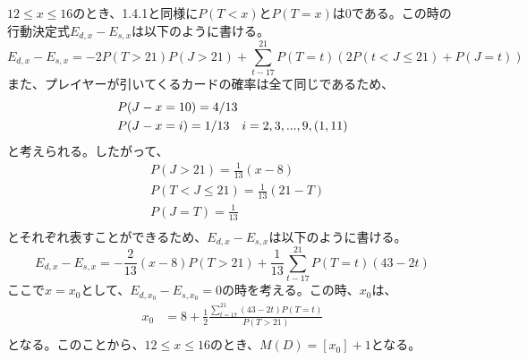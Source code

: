         \subsubsection{}
            $12\leq x \leq 16$のとき、1.4.1と同様に$P(T < x)$と$P(T = x)$は0である。この時の行動決定式$E_{d,x} - E_{s,x}$は以下のように書ける。
            \begin{displaymath}
                E_{d,x} - E_{s,x} = -2P(T>21)P(J>21) + \sum_{t-17}^{21}P(T=t)(2P(t<J\leq21) + P(J=t))
            \end{displaymath}
            また、プレイヤーが引いてくるカードの確率は全て同じであるため、
            \begin{eqnarray}
                \begin{split}
                    &P(J-x=10)=4/13 \notag\\
                    &P(J-x=i)=1/13 \quad i=2,3,...,9,(1,11) \notag
                \end{split}
            \end{eqnarray}
            と考えられる。したがって、
            \begin{displaymath}
                \begin{split}
                    &P(J>21)=\frac{1}{13}(x-8)\\
                    &P(T<J\leq21)=\frac{1}{13}(21-T)\\
                    &P(J=T)=\frac{1}{13}\\
                \end{split}
            \end{displaymath}
                とそれぞれ表すことができるため、$E_{d,x} - E_{s,x}$は以下のように書ける。
            \begin{displaymath}
                E_{d,x} - E_{s,x} = -\frac{2}{13}(x-8)P(T>21)+\frac{1}{13}\sum_{t-17}^{21}P(T=t)(43-2t)
            \end{displaymath}
            ここで$x=x_0$として、$E_{d,x_0} - E_{s,x_0}=0$の時を考える。この時、$x_0$は、
            \begin{displaymath}
                \begin{split}
                    x_0&=8+\frac{1}{2}\frac{\sum_{t=17}^{21}(43-2t)P(T=t)}{P(T>21)}\\
                \end{split}
            \end{displaymath}
            となる。このことから、$12\leq x\leq 16$のとき、$M(D)=[x_0]+1$となる。
